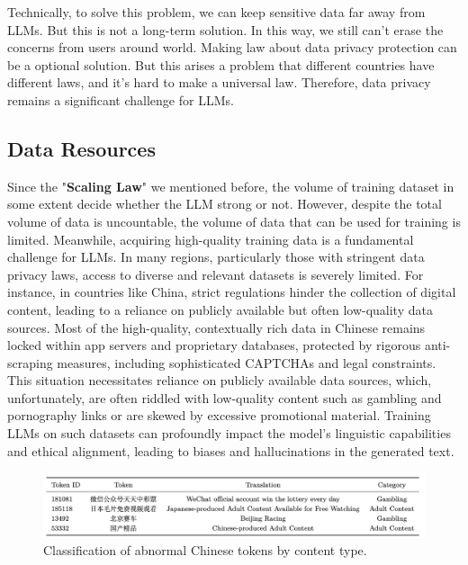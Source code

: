 \documentclass[fleqn,10pt]{SelfArx} %
\begin{document}
Technically, to solve this problem, we can keep sensitive data far away from LLMs. But this is not a long-term solution. In this way, we still can't erase the concerns from users around world. Making law about data privacy protection can be a optional solution. But this arises a problem that different countries have different laws, and it's hard to make a universal law. Therefore, data privacy remains a significant challenge for LLMs.
\subsection{Data Resources}

Since the "\textbf{Scaling Law}" we mentioned before, the volume of training dataset in some extent decide whether the LLM strong or not. However, despite the total volume of data is uncountable, the volume of data that can be used for training is limited. Meanwhile, acquiring high-quality training data is a fundamental challenge for LLMs. In many regions, particularly those with stringent data privacy laws, access to diverse and relevant datasets is severely limited. For instance, in countries like China, strict regulations hinder the collection of digital content, leading to a reliance on publicly available but often low-quality data sources\cite{yang2024problematictokenstokenizerbias}. Most of the high-quality, contextually rich data in Chinese remains locked within app servers and proprietary databases, protected by rigorous anti-scraping measures, including sophisticated CAPTCHAs and legal constraints. This situation necessitates reliance on publicly available data sources, which, unfortunately, are often riddled with low-quality content such as gambling and pornography links or are skewed by excessive promotional material. Training LLMs on such datasets can profoundly impact the model's linguistic capabilities and ethical alignment, leading to biases and hallucinations in the generated text.
\begin{figure}[ht]\centering
	\includegraphics[width=\linewidth]{Figures/token_samples.jpg}
	\caption{Classification of abnormal Chinese tokens by content type.\cite{yang2024problematictokenstokenizerbias}}
	\label{fig:token_samples}
\end{figure}
\end{document}
